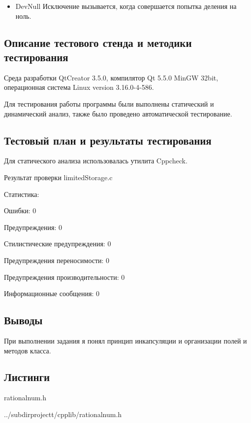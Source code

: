 \documentclass[12pt,a4paper]{report}
\begin{document}
		\begin{itemize}
		\item DevNull
		Исключение вызывается, когда совершается попытка деления на ноль.
		\end{itemize}
		
		
\subsection{Описание тестового стенда и методики тестирования}
Среда разработки QtCreator 3.5.0, компилятор Qt 5.5.0 MinGW 32bit, операционная система Linux version 3.16.0-4-586.

Для тестирования работы программы были выполнены статический и динамический анализ, также было проведено автоматической тестирование.

\subsection{Тестовый план и результаты тестирования}

Для статического анализа использовалась утилита Cppcheck.

\vspace{\baselineskip}
Результат проверки limitedStorage.c 

Статистика:

Ошибки:	0

Предупреждения:	0

Стилистические предупреждения:	0

Предупреждения переносимости:	0

Предупреждения производительности:	0

Информационные сообщения:	0




\vspace{\baselineskip}



\subsection{Выводы}

При выполнении задания я понял принцип инкапсуляции и организации полей и методов класса.

\subsection*{Листинги}
rationalnum.h

{../subdirprojectt/cpplib/rationalnum.h}
\end{document}
